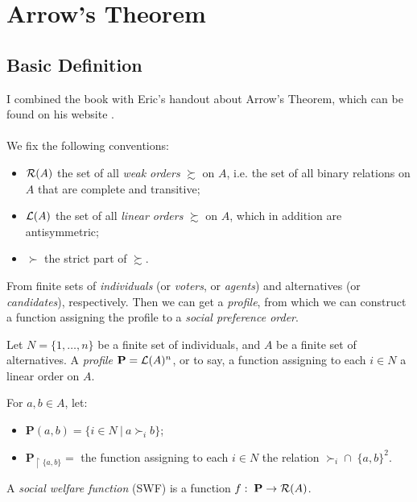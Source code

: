 \chapter{Arrow's Theorem}

\section{Basic Definition}

I combined the book with Eric's handout about Arrow's Theorem, which can be found on his website \parencite{Pacuit}.\\
~\\
We fix the following conventions:
\begin{itemize}
    \item $\mathcal{R}(A)$ the set of all \textit{weak orders} $\succsim$ on $A$, i.e. the set of all binary relations on $A$ that are complete and transitive;
    \item $\mathcal{L}(A)$ the set of all \textit{linear orders} $\succsim$ on $A$, which in addition are antisymmetric;
    \item $\succ$ the strict part of $\succsim$.
\end{itemize}

From finite sets of \textit{individuals} (or \textit{voters}, or \textit{agents}) and alternatives (or \textit{candidates}), respectively. Then we can get a \textit{profile}, from which we can construct a function assigning the profile to a \textit{social preference order}.

\begin{definition}[Profile]
    Let $N = \{1, \dots, n\}$ be a finite set of individuals, and $A$ be a finite set of alternatives. A \textit{profile} $\mathbf{P} = \mathcal{L}(A)^n$, or to say, a function assigning to each $i \in N$ a linear order on $A$.
\end{definition}

For $a,b \in A$, let:
\begin{itemize}
    \item $\mathbf{P}(a,b) = \{i \in N\ |\ a \succ_i b\}$;
    \item $\mathbf{P}_{\upharpoonright\{a,b\}} = $ the function assigning to each $i \in N$ the relation $\succ_i \cap \;\{a,b\}^2$.
\end{itemize}

\begin{definition}
    A \textit{social welfare function} (SWF) is a function $f: \; \mathbf{P} \to \mathcal{R}(A)$. 
\end{definition}

